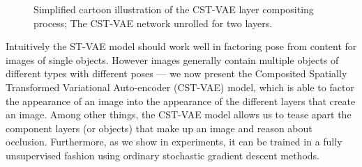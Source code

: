 \begin{figure}[t]
\begin{center}
\qquad
{}
\end{center}
 \caption{
  Simplified cartoon illustration of the CST-VAE layer compositing process; 
  The CST-VAE network unrolled for two layers.
 }
\label{fig:stvaemodel}
\end{figure}

Intuitively the ST-VAE model should work well in factoring pose from content for images of single objects.
However images generally contain multiple objects of different types with different poses --- we now present
the Composited Spatially Transformed Variational Auto-encoder  (CST-VAE) model, which is able to factor
the appearance of an image into the appearance of the different layers
that create an image.  
Among other things, the CST-VAE model allows us to tease
apart the component layers (or objects) that make up an image and reason about occlusion.
Furthermore, as we show in experiments, it can be trained in a fully unsupervised fashion using ordinary stochastic
gradient descent methods.  %

